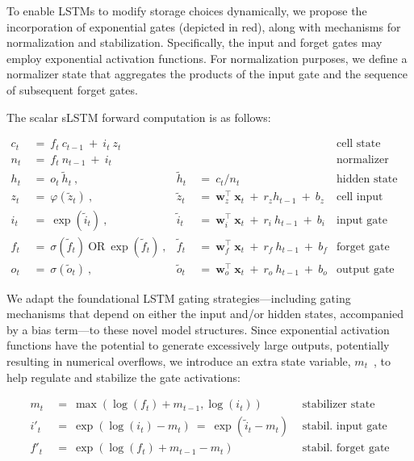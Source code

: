 To enable LSTMs to modify storage choices dynamically, we propose the incorporation of exponential gates (depicted in red), along with mechanisms for normalization and stabilization. Specifically, the input and forget gates may employ exponential activation functions. For normalization purposes, we define a normalizer state that aggregates the products of the input gate and the sequence of subsequent forget gates.

The scalar sLSTM forward computation is as follows:

\begin{align}
\label{eq:slstmforward}
c_t \ &= \  f_t \ c_{t-1} \ + \ i_t \ z_t & & 
 &\text{cell state} \\
n_t \ &= \  f_t \ n_{t-1} \ + \ i_t  & & 
 &\text{normalizer state} \\
h_t \ &= \ o_t \ \tilde{h}_t \ ,
  &\tilde{h}_t \ &= \ c_t / n_t
&\text{hidden state} \\
z_t \ &= \ \varphi \left( \tilde{z}_t \right) \ , 
  &\tilde{z}_t \ &=  \ \mathbf{w}^\top_{z} \ \mathbf{x}_t \ + \
  r_{z}  h_{t-1} \ + \  b_{z}
  &\text{cell input} \\
i_t \ &= \ \!\exp \left( \tilde{i}_t  \right) \ , 
  &\tilde{i}_t \ &= \ \mathbf{w}^\top_{i} \ \mathbf{x}_t \ + \
  r_{i}  \ h_{t-1} \ + \  b_{i}
  &\text{input gate} \\
f_t \ &= \ \sigma \left(  \tilde{f}_t \right) \ \text{OR} \
\!\exp \left(  \tilde{f}_t \right) \ ,
  &\tilde{f}_t \ &= \ \mathbf{w}^\top_{f} \ \mathbf{x}_t  \ + \
  r_{f}  \ h_{t-1} \ + \  b_{f}
  &\text{forget gate} \\
o_t \ &= \ \sigma \left( \tilde{o}_t \right) \ , 
  &\tilde{o}_t  \ &= \ \mathbf{w}^\top_{o} \ \mathbf{x}_t \ + \
  r_{o}  \ h_{t-1} \ + \  b_{o}
  &\text{output gate} 
\end{align}

We adapt the foundational LSTM gating strategies—including gating mechanisms that depend on either the input and/or hidden states, accompanied by a bias term—to these novel model structures. Since exponential activation functions have the potential to generate excessively large outputs, potentially resulting in numerical overflows, we introduce an extra state variable, \mbox{$m_t$~\citep{Milakov:18arxiv}}, to help regulate and stabilize the gate activations:

\begin{align}
\label{eq:slstmstabil}
m_t \ &= \ \max \left( \log ( f_t ) + m_{t-1} , \log ( i_t ) \right) &\text{stabilizer state} \\
i'_t \ &= \ \!\exp \left( \log \left ( i_t \right) - m_t \right) \ = \ \!\exp \left( \tilde{i}_t - m_t \right) \ \, 
  &\text{stabil. input gate} \\
f'_t \ &= \ \!\exp \left( \log \left( f_t \right) + m_{t-1} - m_t \right) \ \, 
  &\text{stabil. forget gate}
\end{align}

